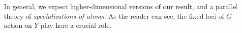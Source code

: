 \documentclass[12pt,a4paper]{amsart}
\theoremstyle{definition}
\theoremstyle{remark}
\begin{document}
In general, we expect higher-dimensional versions of our result, and a parallel theory of \textit{specializations of atoms}. As the reader can see, the fixed loci of $G$-action on $Y$ play here a crucial role.


\end{document}
